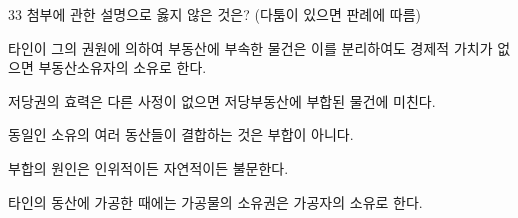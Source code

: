 \begin{question}{33}
첨부에 관한 설명으로 옳지 않은 것은? (다툼이 있으면 판례에 따름)
\begin{choices}
  \item 타인이 그의 권원에 의하여 부동산에 부속한 물건은 이를 분리하여도 경제적 가치가 없으면 부동산소유자의 소유로 한다.
  \item 저당권의 효력은 다른 사정이 없으면 저당부동산에 부합된 물건에 미친다.
  \item 동일인 소유의 여러 동산들이 결합하는 것은 부합이 아니다.
  \item 부합의 원인은 인위적이든 자연적이든 불문한다.
  \item 타인의 동산에 가공한 때에는 가공물의 소유권은 가공자의 소유로 한다.
\end{choices}
\end{question}
